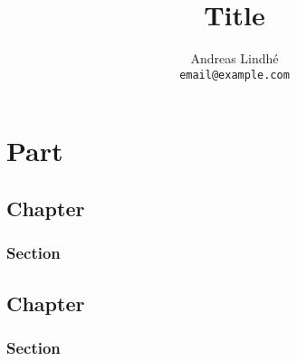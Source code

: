 \documentclass[a4paper]{report}
\title{Title}
\author{Andreas Lindhé\\
    \texttt{email@example.com}}
\begin{document}
\maketitle

\tableofcontents

\abstract

\lipsum[1]

\part{Part}

\chapter{Chapter}

\section{Section}

%

\lipsum[1-2]


\appendix

\chapter{Chapter}

\section{Section}

%

\lipsum[1-2]
\end{document}
